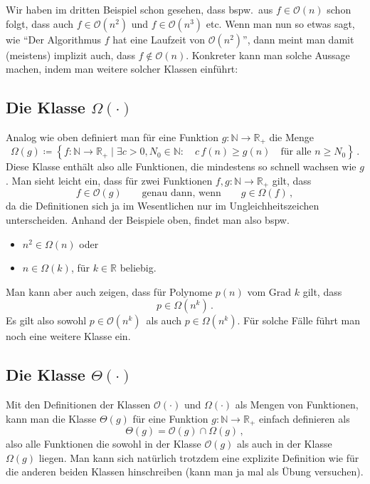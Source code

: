 \documentclass[fontsize=12pt,paper=14,div=calc,parskip=full]{scrartcl}
\def\N{\mathbb{N}}
\def\R{\mathbb{R}}
\begin{document}
Wir haben im dritten Beispiel schon gesehen, dass bspw.\ aus
$f \in \mathcal{O}(n)$ schon folgt, dass auch $f \in \mathcal{O}(n^2)$
und $f \in \mathcal{O}(n^3)$ etc. Wenn man nun so etwas sagt, wie
``Der Algorithmus $f$ hat eine Laufzeit von $\mathcal{O}(n^2)$'', dann
meint man damit (meistens) implizit auch, dass $f \not\in \mathcal{O}(n)$.
Konkreter kann man solche Aussage machen, indem man weitere solcher Klassen einführt:

\subsection*{Die Klasse $\Omega(\cdot)$}
Analog wie oben definiert man für eine Funktion
$g : \N \rightarrow \R_+$ die Menge
\[
  \Omega(g) \coloneqq \left\{ f : \N \rightarrow \R_+ \mid \exists c >
    0, N_0 \in \N: \quad c\,f(n) \ge g(n) \quad \text{für alle } n \ge
    N_0 \right\} \,.
\]
Diese Klasse enthält also alle Funktionen, die mindestens so schnell
wachsen wie $g$. Man sieht leicht ein, dass für zwei Funktionen
$f,g : \N \rightarrow \R_+$ gilt, dass
\[
  f \in \mathcal{O}(g) \qquad \text{genau dann, wenn} \qquad g \in
  \Omega(f) \,,
\]
da die Definitionen sich ja im Wesentlichen nur im
Ungleichheitszeichen unterscheiden. Anhand der Beispiele oben, findet
man also bspw.
\begin{itemize}
\item $n^2 \in \Omega(n)$ oder
\item $n \in \Omega(k)$, für $k \in \R$ beliebig.
\end{itemize}
Man kann aber auch zeigen, dass für Polynome $p(n)$ vom Grad $k$ gilt,
dass
\[
  p \in \Omega(n^k)\,.
\]
Es gilt also sowohl $p \in \mathcal{O}(n^k)\,$ als auch
$p \in \Omega(n^k)$.  Für solche Fälle führt man noch eine weitere
Klasse ein.

\subsection*{Die Klasse $\Theta(\cdot)$}
Mit den Definitionen der Klassen $\mathcal{O}(\cdot)$ und
$\Omega(\cdot)$ als Mengen von Funktionen, kann man die Klasse
$\Theta(g)$ für eine Funktion $g : \N \rightarrow \R_+$ einfach
definieren als
\[
  \Theta(g) = \mathcal{O}(g) \cap \Omega(g) \,,
\]
also alle Funktionen die sowohl in der Klasse $\mathcal{O}(g)$ als
auch in der Klasse $\Omega(g)$ liegen. Man kann sich natürlich
trotzdem eine explizite Definition wie für die anderen beiden Klassen
hinschreiben (kann man ja mal als Übung versuchen).
\end{document}
